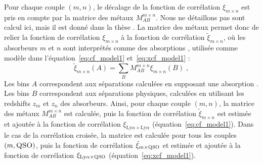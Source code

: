 \documentclass[11pt, twoside, a4paper, openright]{report}
\begin{document}

Pour chaque couple $(m, n)$, le décalage de la fonction de corrélation $\xi_{m\times n}$ est pris en compte par la matrice des métaux $M_{AB}^{m\times n}$.
Nous ne détaillons pas sont calcul ici, mais il est donné dans la thèse \citet{CITE:Victoria}. La matrice des métaux permet donc de relier la fonction de corrélation $\xi_{m\times n}$ à la fonction de corrélation $\tilde \xi_{m\times n}$, où les absorbeurs $m$ et $n$ sont interprétés comme des absorptions \lya{}, utilisée comme modèle dans l'équation~\ref{eq:cf_model1} et~\ref{eq:xcf_model1} :
\begin{equation}
  \tilde \xi_{m \times n}(A) = \sum_B M_{AB}^{m\times n} \xi_{m\times n}(B) \; ,
\end{equation}
Les bins $A$ correspondent aux séparations calculées en supposant une absorption \lya{}. Les bins $B$ correspondent aux séparations physiques, calculées en utilisant les redshifts $z_m$ et $z_n$ des absorbeurs.
Ainsi, pour chaque couple $(m, n)$, la matrice des métaux $M_{AB}^{m\times n}$ est calculée, puis la fonction de corrélation $\tilde \xi_{m \times n}$ est estimée et ajoutée à la fonction de corrélation $\xi_{\mathrm{Ly}\alpha\times\mathrm{Ly}\alpha}$ (équation~\ref{eq:cf_model1}).
Dans le cas de la corrélation croisée, la matrice est calculée pour tous les couples $(m, \textsc{QSO})$, puis la fonction de corrélation $\tilde \xi_{m \times \textsc{QSO}}$ et estimée et ajoutée à la fonction de corrélation $\xi_{\mathrm{Ly}\alpha\times\textsc{QSO}}$ (équation~\ref{eq:xcf_model1}).
\end{document}
